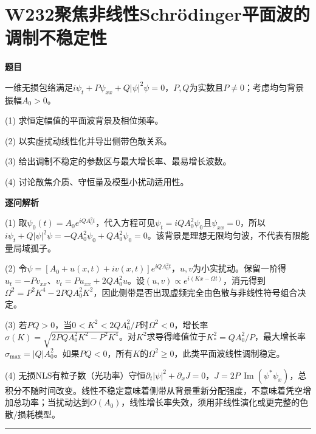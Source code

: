 \documentclass[UTF8,a4paper,11pt,oneside,openany]{ctexbook}
\begin{document}
\section*{W232\quad 聚焦非线性Schrödinger平面波的调制不稳定性}
\textbf{题目}\par
一维无损包络满足$i\psi_t+P\psi_{xx}+Q|\psi|^2\psi=0$，$P,Q$为实数且$P\ne0$；考虑均匀背景振幅$A_0>0$。
\par\smallskip\noindent (1) 求恒定幅值的平面波背景及相位频率。
\par\smallskip\noindent (2) 以实虚扰动线性化并导出侧带色散关系。
\par\smallskip\noindent (3) 给出调制不稳定的参数区与最大增长率、最易增长波数。
\par\smallskip\noindent (4) 讨论散焦介质、守恒量及模型小扰动适用性。
\par\medskip\textbf{逐问解析}\par
\par\smallskip\noindent (1) 取$\psi_0(t)=A_0e^{iQA_0^2t}$，代入方程可见$\psi_t=iQA_0^2\psi_0$且$\psi_{xx}=0$，所以$i\psi_t+Q|\psi|^2\psi=-QA_0^2\psi_0+QA_0^2\psi_0=0$。该背景是理想无限均匀波，不代表有限能量局域孤子。
\par\smallskip\noindent (2) 令$\psi=[A_0+u(x,t)+iv(x,t)]e^{iQA_0^2t}$，$u,v$为小实扰动。保留一阶得$u_t=-P v_{xx}$、$v_t=P u_{xx}+2QA_0^2u$。设$(u,v)\propto e^{i(Kx-\Omega t)}$，消元得到$\Omega^2=P^2K^4-2PQA_0^2K^2$，因此侧带是否出现虚频完全由色散与非线性符号组合决定。
\par\smallskip\noindent (3) 若$PQ>0$，当$0<K^2<2QA_0^2/P$时$\Omega^2<0$，增长率$\sigma(K)=\sqrt{2PQA_0^2K^2-P^2K^4}$。对$K^2$求导得峰值位于$K_*^2=QA_0^2/P$，最大增长率$\sigma_{\max}=|Q|A_0^2$。如果$PQ<0$，所有$K$的$\Omega^2\ge0$，此类平面波线性调制稳定。
\par\smallskip\noindent (4) 无损NLS有粒子数（光功率）守恒$\partial_t|\psi|^2+\partial_x J=0$，$J=2P\,\operatorname{Im}(\psi^*\psi_x)$，总积分不随时间改变。线性不稳定意味着侧带从背景重新分配强度，不意味着凭空增加总功率；当扰动达到$O(A_0)$，线性增长率失效，须用非线性演化或更完整的色散/损耗模型。
\par\medskip\hrule\medskip
\end{document}
